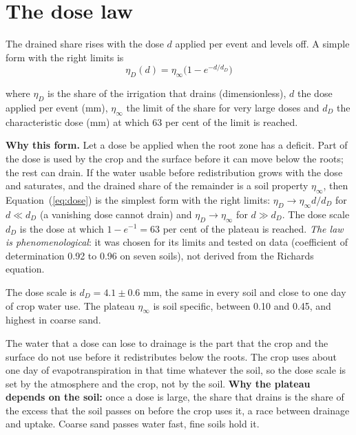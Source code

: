 \section{The dose law}
The drained share rises with the dose $d$ applied per event and levels off. A simple form with the right limits is
\begin{equation}\label{eq:dose}\boxed{\boxed{\;\eta_D(d)=\eta_\infty\bigl(1-e^{-d/d_D}\bigr)\;}}\end{equation}
\par\noindent where $\eta_D$ is the share of the irrigation that drains (dimensionless), $d$ the dose applied per event (mm), $\eta_\infty$ the limit of the share for very large doses and $d_D$ the characteristic dose (mm) at which 63 per cent of the limit is reached.

\textbf{Why this form.} Let a dose be applied when the root zone has a deficit. Part of the dose is used by the crop and the surface before it can move below the roots; the rest can drain. If the water usable before redistribution grows with the dose and saturates, and the drained share of the remainder is a soil property $\eta_\infty$, then Equation~(\ref{eq:dose}) is the simplest form with the right limits: $\eta_D\to\eta_\infty d/d_D$ for $d\ll d_D$ (a vanishing dose cannot drain) and $\eta_D\to\eta_\infty$ for $d\gg d_D$. The dose scale $d_D$ is the dose at which $1-e^{-1}=63$ per cent of the plateau is reached. \emph{The law is phenomenological}: it was chosen for its limits and tested on data (coefficient of determination 0.92 to 0.96 on seven soils), not derived from the Richards equation.

 The dose scale is $d_D=4.1\pm0.6$ mm, the same in every soil and close to one day of crop water use. The plateau $\eta_\infty$ is soil specific, between 0.10 and 0.45, and highest in coarse sand.

 The water that a dose can lose to drainage is the part that the crop and the surface do not use before it redistributes below the roots. The crop uses about one day of evapotranspiration in that time whatever the soil, so the dose scale is set by the atmosphere and the crop, not by the soil. \textbf{Why the plateau depends on the soil:} once a dose is large, the share that drains is the share of the excess that the soil passes on before the crop uses it, a race between drainage and uptake. Coarse sand passes water fast, fine soils hold it.




